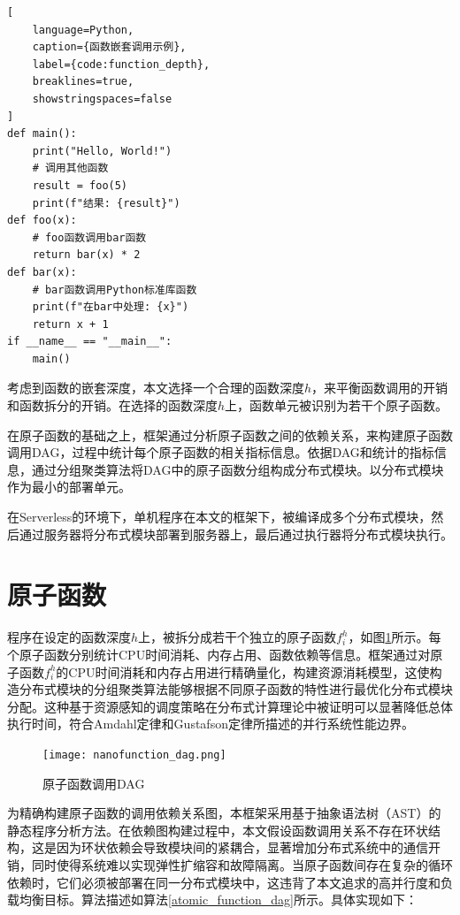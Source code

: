 \begin{lstlisting}[
	language=Python,
	caption={函数嵌套调用示例},
	label={code:function_depth},
	breaklines=true,
	showstringspaces=false
]
def main():
    print("Hello, World!")
    # 调用其他函数
    result = foo(5)
    print(f"结果: {result}")
def foo(x):
    # foo函数调用bar函数
    return bar(x) * 2
def bar(x):
    # bar函数调用Python标准库函数
    print(f"在bar中处理: {x}")
    return x + 1
if __name__ == "__main__":
    main()
\end{lstlisting}

考虑到函数的嵌套深度，本文选择一个合理的函数深度$h$，来平衡函数调用的开销和函数拆分的开销。在选择的函数深度$h$上，函数单元被识别为若干个原子函数。

在原子函数的基础之上，框架通过分析原子函数之间的依赖关系，来构建原子函数调用DAG，过程中统计每个原子函数的相关指标信息。依据DAG和统计的指标信息，通过分组聚类算法将DAG中的原子函数分组构成分布式模块。以分布式模块作为最小的部署单元。

在Serverless的环境下，单机程序在本文的框架下，被编译成多个分布式模块，然后通过服务器将分布式模块部署到服务器上，最后通过执行器将分布式模块执行。


\section{原子函数}
\label{sec:nanofunction}
程序在设定的函数深度$h$上，被拆分成若干个独立的原子函数$f_{i}^{h}$，如图\ref{fig:nanofunction_dag}所示。每个原子函数分别统计CPU时间消耗、内存占用、函数依赖等信息。框架通过对原子函数$f_{i}^{h}$的CPU时间消耗和内存占用进行精确量化，构建资源消耗模型，这使构造分布式模块的分组聚类算法能够根据不同原子函数的特性进行最优化分布式模块分配。这种基于资源感知的调度策略在分布式计算理论中被证明可以显著降低总体执行时间，符合Amdahl定律和Gustafson定律所描述的并行系统性能边界。

\begin{figure}[h]
\centering
\texttt{[image: nanofunction\_dag.png]}
\caption{原子函数调用DAG}
\label{fig:nanofunction_dag}
\end{figure}

为精确构建原子函数的调用依赖关系图，本框架采用基于抽象语法树（AST）的静态程序分析方法。在依赖图构建过程中，本文假设函数调用关系不存在环状结构，这是因为环状依赖会导致模块间的紧耦合，显著增加分布式系统中的通信开销，同时使得系统难以实现弹性扩缩容和故障隔离。当原子函数间存在复杂的循环依赖时，它们必须被部署在同一分布式模块中，这违背了本文追求的高并行度和负载均衡目标。算法描述如算法\ref{atomic_function_dag}所示。具体实现如下：


